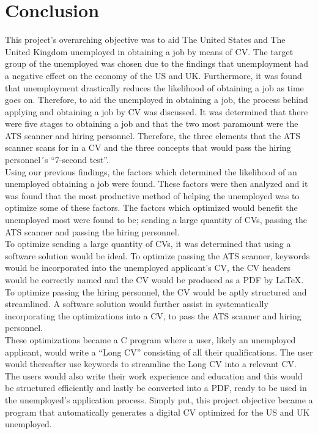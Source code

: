 \section{Conclusion}\label{sec:conclusion}
This project’s overarching objective was to aid The United States and The United Kingdom unemployed in obtaining a job by means of CV. 
The target group of the unemployed was chosen due to the findings that unemployment had a negative effect on the economy of the US and UK.
Furthermore, it was found that unemployment drastically reduces the likelihood of obtaining a job as time goes on.
Therefore, to aid the unemployed in obtaining a job, the process behind applying and obtaining a job by CV was discussed. 
It was determined that there were five stages to obtaining a job and that the two most paramount were the ATS scanner and hiring personnel.
Therefore, the three elements that the ATS scanner scans for in a CV and the three concepts that would pass the hiring personnel´s “7-second test”. \\

Using our previous findings, the factors which determined the likelihood of an unemployed obtaining a job were found. 
These factors were then analyzed and it was found that the most productive method of helping the unemployed was to optimize some of these factors.
The factors which optimized would benefit the unemployed most were found to be; sending a large quantity of CVs, passing the ATS scanner and passing the hiring personnel. \\

To optimize sending a large quantity of CVs, it was determined that using a software solution would be ideal. 
To optimize passing the ATS scanner, keywords would be incorporated into the unemployed applicant’s CV, the CV headers would be correctly named and the CV would be produced as a PDF by LaTeX. 
To optimize passing the hiring personnel, the CV would be aptly structured and streamlined. 
A software solution would further assist in systematically incorporating the optimizations into a CV, to pass the ATS scanner and hiring personnel. \\

These optimizations became a C program where a user, likely an unemployed applicant, would write a “Long CV” consisting of all their qualifications.
The user would thereafter use keywords to streamline the Long CV into a relevant CV.
The users would also write their work experience and education and this would be structured efficiently and lastly be converted into a PDF, ready to be used in the unemployed's application process. 
Simply put, this project objective became a program that automatically generates a digital CV optimized for the US and UK unemployed. \\

